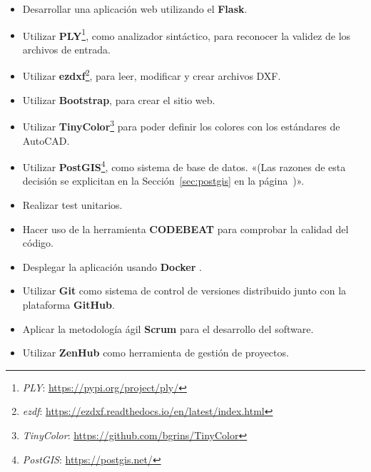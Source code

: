 \begin{itemize}
\item Desarrollar una aplicación web utilizando el  \textbf {Flask}.

\item Utilizar \textbf {PLY}\footnote{\textsl{PLY}: \url{https://pypi.org/project/ply/}}, como analizador sintáctico, para reconocer la validez de los archivos de entrada.

\item Utilizar \textbf {ezdxf}\footnote{\textsl{ezdf}: \url{https://ezdxf.readthedocs.io/en/latest/index.html}}, para leer, modificar y crear archivos DXF. 

\item Utilizar \textbf {Bootstrap}, para crear el sitio web.

\item Utilizar \textbf {TinyColor}\footnote{\textsl{TinyColor}: \url{https://github.com/bgrins/TinyColor}} para poder definir los colores con los estándares de AutoCAD.

\item Utilizar  \textbf {PostGIS}\footnote{\textsl{PostGIS}: \url{https://postgis.net/}}, como sistema de base de datos. «(Las razones de esta decisión se explicitan en la Sección~\ref{sec:postgis} en la página~\pageref{sec:postgis})». 

\item Realizar test unitarios.

\item Hacer uso de la herramienta \textbf {CODEBEAT} para comprobar la calidad del código.

\item Desplegar la aplicación usando \textbf {Docker} .

\item Utilizar \textbf {Git} como sistema de control de versiones distribuido junto con la plataforma \textbf {GitHub}.

\item Aplicar la metodología ágil \textbf {Scrum} para el desarrollo del software.

\item Utilizar \textbf {ZenHub} como herramienta de gestión de proyectos.
\end{itemize}

